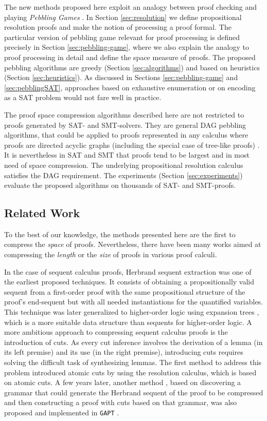 The new methods proposed here exploit an analogy between proof checking and playing \emph{Pebbling Games} \cite{Kasai1979,Gilbert1980}.
In Section \ref{sec:resolution} we define propositional resolution proofs and make the notion of processing a proof formal.
The particular version of pebbling game relevant for proof processing is defined precisely in Section \ref{sec:pebbling-game}, where we also explain the analogy to proof processing in detail and define the space measure of proofs. The proposed pebbling algorithms are greedy (Section \ref{sec:algorithms}) and based on heuristics (Section \ref{sec:heuristics}). As discussed in Sections \ref{sec:pebbling-game} and \ref{sec:pebblingSAT}, approaches based on exhaustive enumeration or on encoding as a SAT problem would not fare well in practice.

The proof space compression algorithms described here are not restricted to proofs generated by SAT- and SMT-solvers. They are general DAG pebbling algorithms, that could be applied to proofs represented in any calculus where proofs are directed acyclic graphs (including the special case of tree-like proofs) \cite{APPA}. It is nevertheless in SAT and SMT that proofs tend to be largest and in most need of space compression. The underlying propositional resolution calculus satisfies the DAG requirement. The experiments (Section \ref{sec:experiments}) evaluate the proposed algorithms on thousands of SAT- and SMT-proofs.

\subsection{Related Work}

To the best of our knowledge, the methods presented here are the first to compress the \emph{space} of proofs. Nevertheless, there have been many works aimed at compressing the \emph{length} or the \emph{size} of proofs in various proof calculi. 

In the case of sequent calculus proofs, Herbrand sequent extraction \cite{B16,B12,B51} was one of the earliest proposed techniques. 
It consists of obtaining a propositionally valid sequent from a first-order proof with the same propositional structure of the proof's end-sequent but with all needed instantiations for the quantified variables. 
This technique was later generalized to higher-order logic \cite{DBLP:journals/corr/LibalRR14} using expansion trees \cite{DBLP:books/daglib/0036008}, which is a more suitable data structure than sequents for higher-order logic. A more ambitious approach to compressing sequent calculus proofs is the introduction of cuts. As every cut inference involves the derivation of a lemma (in its left premise) and its use (in the right premise), introducing cuts requires solving the difficult task of synthesizing lemmas. The first method \cite{BrunoLPAR} to address this problem introduced atomic cuts by using the resolution calculus, which is based on atomic cuts. A few years later, another method \cite{Hetzl}, based on discovering a grammar that could generate the Herbrand sequent of the proof to be compressed and then constructing a proof with cuts based on that grammar, was also proposed and implemented in \texttt{GAPT} \cite{GAPT}. 

